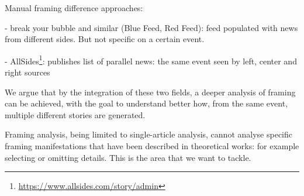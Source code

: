 Manual framing difference approaches:

- break your bubble and similar (Blue Feed, Red Feed): feed populated with news from different sides. But not specific on a certain event.

- AllSides\footnote{\url{https://www.allsides.com/story/admin}}: publishes list of parallel news: the same event seen by left, center and right sources


We argue that by the integration of these two fields, a deeper analysis of framing can be achieved, with the goal to understand better how, from the same event, multiple different stories are generated.

Framing analysis, being limited to single-article analysis, cannot analyse specific framing manifestations that have been described in theoretical works: for example selecting or omitting details. This is the area that we want to tackle.











